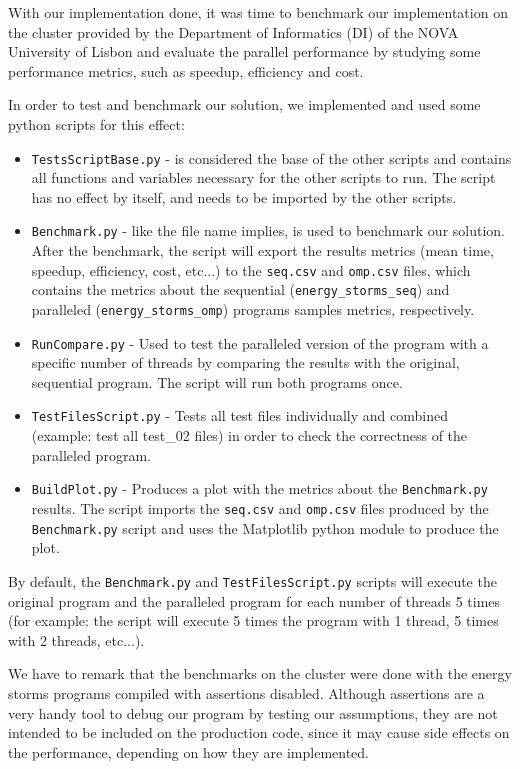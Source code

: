 With our implementation done, it was time to benchmark our implementation on the cluster provided by the Department of Informatics (DI) of the NOVA University of Lisbon and evaluate the parallel performance by studying some performance metrics, such as speedup, efficiency and cost. 
\par In order to test and benchmark our solution, we implemented and used some python scripts for this effect:
\begin{itemize}
    \item \verb|TestsScriptBase.py| - is considered the base of the other scripts and contains all functions and variables necessary for the other scripts to run. The script has no effect by itself, and needs to be imported by the other scripts.
    \item \verb|Benchmark.py| - like the file name implies, is used to benchmark our solution. After the benchmark, the script will export the results metrics (mean time, speedup, efficiency, cost, etc...) to the \verb|seq.csv| and \verb|omp.csv| files, which contains the metrics about the sequential (\verb|energy_storms_seq|) and paralleled (\verb|energy_storms_omp|) programs samples metrics, respectively.
    \item \verb|RunCompare.py| - Used to test the paralleled version of the program with a specific number of threads by comparing the results with the original, sequential program. The script will run both programs once.
    \item \verb|TestFilesScript.py| - Tests all test files individually and combined (example: test all test\_02 files) in order to check the correctness of the paralleled program.     
    \item \verb|BuildPlot.py| - Produces a plot with the metrics about the \verb|Benchmark.py| results. The script imports the \verb|seq.csv| and \verb|omp.csv| files produced by the \verb|Benchmark.py| script and uses the Matplotlib python module to produce the plot.   
\end{itemize}
By default, the \verb|Benchmark.py| and \verb|TestFilesScript.py| scripts will execute the original program and the paralleled program for each number of threads 5 times (for example: the script will execute 5 times the program with 1 thread, 5 times with 2 threads, etc...).
\par We have to remark that the benchmarks on the cluster were done with the energy storms programs compiled with assertions disabled. Although assertions are a very handy tool to debug our program by testing our assumptions, they are not intended to be included on the production code, since it may cause side effects on the performance, depending on how they are implemented.
